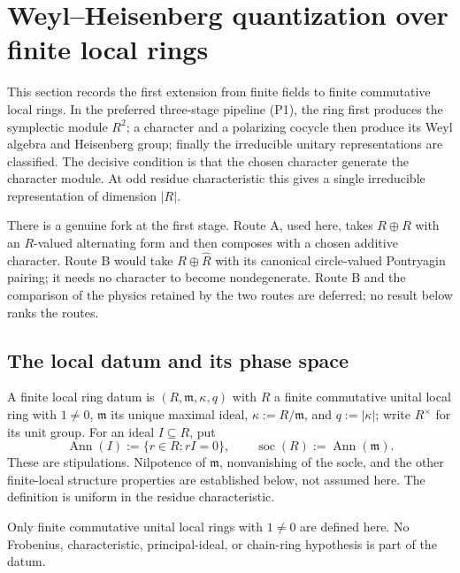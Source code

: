 \section{Weyl--Heisenberg quantization over finite local rings}
\label{sec:local-rings}

This section records the first extension from finite fields to finite
commutative local rings.  In the preferred three-stage pipeline (P1), the
ring first produces the symplectic module $R^2$; a character and a polarizing
cocycle then produce its Weyl algebra and Heisenberg group; finally the
irreducible unitary representations are classified.  The decisive condition
is that the chosen character generate the character module.  At odd residue
characteristic this gives a single irreducible representation of dimension
$|R|$.

There is a genuine fork at the first stage.  Route A, used here, takes
$R\oplus R$ with an $R$-valued alternating form and then composes with a
chosen additive character.  Route B would take
$R\oplus\widehat R$ with its canonical circle-valued Pontryagin pairing; it
needs no character to become nondegenerate.  Route B and the comparison of
the physics retained by the two routes are deferred; no result below ranks
the routes.

\subsection{The local datum and its phase space}

\begin{definition}
\label{def:finite-local-datum}
A finite local ring datum is $(R,\mathfrak m,\kappa,q)$ with $R$ a finite
commutative unital local ring with $1\neq0$, $\mathfrak m$ its unique maximal
ideal, $\kappa:=R/\mathfrak m$, and $q:=|\kappa|$; write $R^\times$ for its
unit group.  For an ideal $I\subseteq R$, put
\[
 \operatorname{Ann}(I):=\{r\in R:rI=0\},
 \qquad
 \operatorname{soc}(R):=\operatorname{Ann}(\mathfrak m).
\]
These are stipulations.  Nilpotence of $\mathfrak m$, nonvanishing of the
socle, and the other finite-local structure properties are established
below, not assumed here.  The definition is uniform in the residue
characteristic.
\end{definition}

\begin{scope}
Only finite commutative unital local rings with $1\neq0$ are defined here.
No Frobenius, characteristic, principal-ideal, or chain-ring hypothesis is
part of the datum.
\end{scope}

